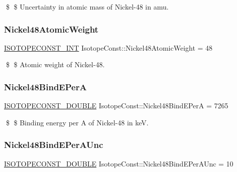 \$ \$ Uncertainty in atomic mass of Nickel-\/48 in amu. \mbox{\label{group___isotope_const-_nickel-_ni48_gad6c7960c99864f3c0e914af3f6b3d908}} 
\subsubsection{\texorpdfstring{Nickel48\+Atomic\+Weight}{Nickel48AtomicWeight}}
{\footnotesize\ttfamily \mbox{\hyperlink{group___isotope_const-_macros_ga5f18360b3e99483a35c32d789e62621c}{I\+S\+O\+T\+O\+P\+E\+C\+O\+N\+S\+T\+\_\+\+I\+NT}} Isotope\+Const\+::\+Nickel48\+Atomic\+Weight = 48}

\$ \$ Atomic weight of Nickel-\/48. \mbox{\label{group___isotope_const-_nickel-_ni48_ga175692733455ade90e419b90f883f608}} 
\subsubsection{\texorpdfstring{Nickel48\+Bind\+E\+PerA}{Nickel48BindEPerA}}
{\footnotesize\ttfamily \mbox{\hyperlink{group___isotope_const-_macros_ga8f45a7272ce02c0b4c65c44636ed719a}{I\+S\+O\+T\+O\+P\+E\+C\+O\+N\+S\+T\+\_\+\+D\+O\+U\+B\+LE}} Isotope\+Const\+::\+Nickel48\+Bind\+E\+PerA = 7265}

\$ \$ Binding energy per A of Nickel-\/48 in keV. \mbox{\label{group___isotope_const-_nickel-_ni48_ga033545906e365a3cc344555baca87fc7}} 
\subsubsection{\texorpdfstring{Nickel48\+Bind\+E\+Per\+A\+Unc}{Nickel48BindEPerAUnc}}
{\footnotesize\ttfamily \mbox{\hyperlink{group___isotope_const-_macros_ga8f45a7272ce02c0b4c65c44636ed719a}{I\+S\+O\+T\+O\+P\+E\+C\+O\+N\+S\+T\+\_\+\+D\+O\+U\+B\+LE}} Isotope\+Const\+::\+Nickel48\+Bind\+E\+Per\+A\+Unc = 10}

